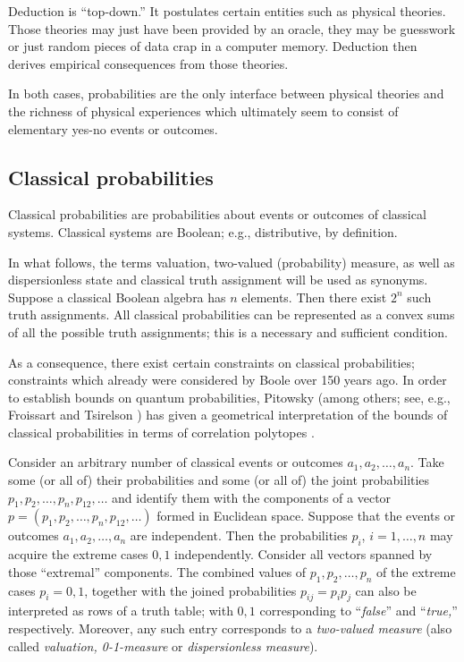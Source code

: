 \documentclass[%
  preprint,
 showpacs,
 showkeys,
 preprintnumbers,
 amsmath,amssymb,
 aps,
 rmp,
  longbibliography,
 ]{revtex4-1}
\begin{document}
Deduction is ``top-down.'' It postulates certain entities such as physical theories.
Those theories may just have been provided by an oracle,
they may be guesswork or just random pieces of data crap in a computer memory.
Deduction then derives empirical consequences from those theories.

In both cases, probabilities are the only interface between physical theories
and the richness of physical experiences which ultimately seem to consist of
elementary yes-no events or outcomes.


\subsection{Classical probabilities}

Classical probabilities are probabilities about events or outcomes of classical systems.
Classical systems are Boolean; e.g., distributive, by definition.

In what follows, the terms valuation, two-valued (probability) measure, as well as
dispersionless state and classical truth assignment will be used as synonyms.
Suppose a classical Boolean algebra has $n$ elements.
Then there exist $2^n$ such truth assignments.
All classical probabilities can be represented as a convex sums
of all the possible truth assignments; this is a necessary and sufficient condition.

As a consequence, there exist certain constraints on classical probabilities; constraints which
already were considered by Boole \cite{Boole,Boole-62} over 150 years ago.
In order to establish bounds on quantum probabilities,
Pitowsky (among others; see, e.g., Froissart \cite{froissart-81} and
Tsirelson  \cite{cirelson:80,cirelson})
has given a geometrical interpretation of the bounds of classical probabilities
in terms of correlation polytopes \cite{pitowsky-86,pitowsky,pitowsky-89a,Pit-91,Pit-94}.

Consider an arbitrary number of classical events or outcomes $a_1, a_2,\ldots , a_n$.
Take some (or all of) their probabilities
and some (or all of) the joint probabilities
$p_1, p_2,\ldots , p_n, p_{12},\ldots $
and identify them with the components of
a vector  $p=(p_1, p_2,\ldots , p_n, p_{12},\ldots )$
formed in Euclidean space.
Suppose that the  events or outcomes
$a_1, a_2,\ldots , a_n$
are independent.
Then the
probabilities $p_i$, $i=1,\ldots ,n$ may acquire
the extreme cases $0,1$ independently.
Consider all vectors spanned by those ``extremal'' components.
The combined values of $p_1, p_2,\ldots , p_n$ of the extreme cases $p_i=0,1$,
together with the joined probabilities $p_{ij} =p_i p_j$
can also be interpreted as rows of a truth table; with $0,1$ corresponding to
``{\it false}'' and
``{\it true,}'' respectively.
Moreover, any such entry corresponds to a {\em two-valued measure}
(also called {\em valuation, 0-1-measure} or {\em dispersionless measure}).
\end{document}

